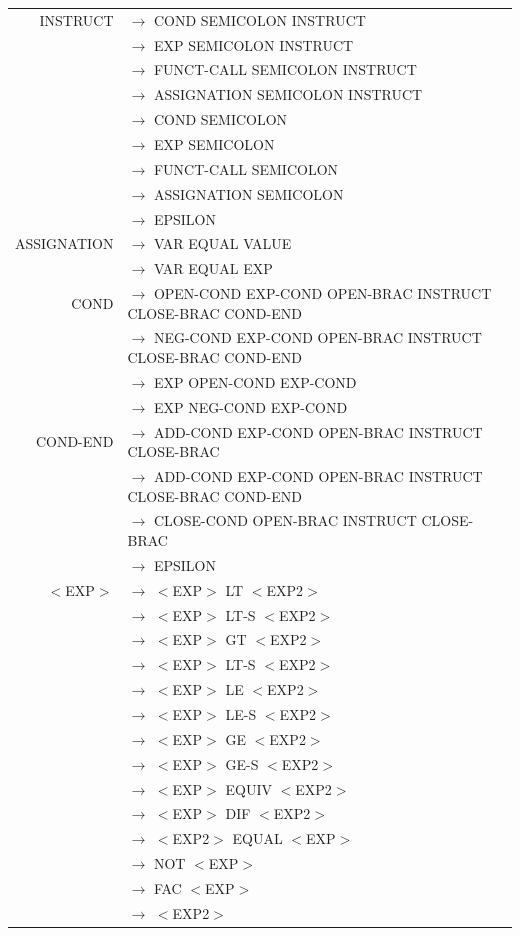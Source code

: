 \documentclass[a4paper,10pt]{article}
\begin{document}
\hspace{-4.5cm}\begin{tabular}{rl}


INSTRUCT			& $\rightarrow$ COND SEMICOLON INSTRUCT\\
					& $\rightarrow$ EXP SEMICOLON INSTRUCT\\
					& $\rightarrow$ FUNCT-CALL SEMICOLON INSTRUCT\\
					& $\rightarrow$ ASSIGNATION SEMICOLON INSTRUCT\\
					& $\rightarrow$ COND SEMICOLON \\
					& $\rightarrow$ EXP SEMICOLON \\
					& $\rightarrow$ FUNCT-CALL SEMICOLON \\
					& $\rightarrow$ ASSIGNATION SEMICOLON \\
					& $\rightarrow$ EPSILON \\
					

ASSIGNATION			& $\rightarrow$ VAR EQUAL VALUE \\
					& $\rightarrow$ VAR EQUAL EXP \\
					
COND				& $\rightarrow$ OPEN-COND EXP-COND OPEN-BRAC INSTRUCT CLOSE-BRAC COND-END\\
					& $\rightarrow$ NEG-COND EXP-COND OPEN-BRAC INSTRUCT CLOSE-BRAC COND-END\\
					& $\rightarrow$ EXP OPEN-COND EXP-COND \\
					& $\rightarrow$ EXP NEG-COND EXP-COND \\


COND-END			& $\rightarrow$ ADD-COND EXP-COND OPEN-BRAC INSTRUCT CLOSE-BRAC \\
					& $\rightarrow$ ADD-COND EXP-COND OPEN-BRAC INSTRUCT CLOSE-BRAC COND-END \\
					& $\rightarrow$ CLOSE-COND OPEN-BRAC INSTRUCT CLOSE-BRAC\\
					& $\rightarrow$ EPSILON \\					

$<$EXP$>$			& $\rightarrow$ $<$EXP$>$ LT $<$EXP2$>$\\
					& $\rightarrow$ $<$EXP$>$ LT-S $<$EXP2$>$\\
					& $\rightarrow$ $<$EXP$>$ GT $<$EXP2$>$\\
					& $\rightarrow$ $<$EXP$>$ LT-S $<$EXP2$>$\\
					& $\rightarrow$ $<$EXP$>$ LE $<$EXP2$>$\\
					& $\rightarrow$ $<$EXP$>$ LE-S $<$EXP2$>$\\
					& $\rightarrow$ $<$EXP$>$ GE $<$EXP2$>$\\
					& $\rightarrow$ $<$EXP$>$ GE-S $<$EXP2$>$\\
					& $\rightarrow$ $<$EXP$>$ EQUIV $<$EXP2$>$\\
					& $\rightarrow$ $<$EXP$>$ DIF $<$EXP2$>$\\
					& $\rightarrow$ $<$EXP2$>$ EQUAL $<$EXP$>$\\
					& $\rightarrow$ NOT $<$EXP$>$ \\
					& $\rightarrow$ FAC $<$EXP$>$ \\
					& $\rightarrow$ $<$EXP2$>$ \\
										

\end{tabular}
\end{document}
